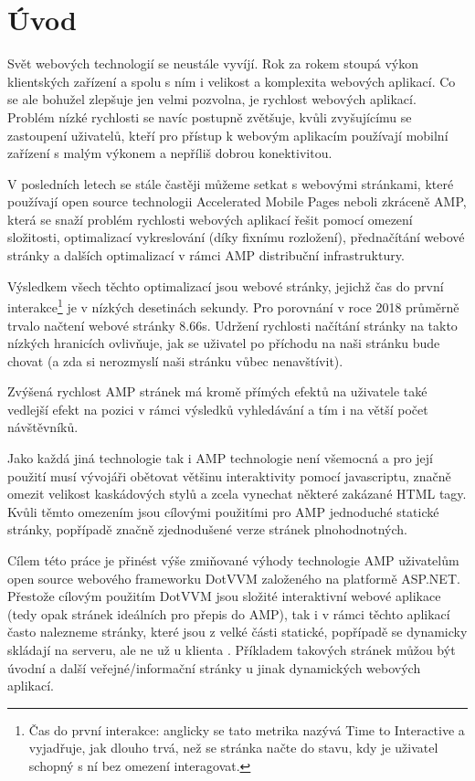 \chapter{Úvod}

Svět webových technologií se neustále vyvíjí. Rok za rokem stoupá výkon klientských zařízení a spolu s
ním i velikost a komplexita webových aplikací. Co se ale bohužel zlepšuje jen velmi pozvolna, je rychlost
webových aplikací. Problém nízké rychlosti se navíc postupně zvětšuje, kvůli zvyšujícímu se zastoupení
uživatelů, kteří pro přístup k webovým aplikacím používají mobilní zařízení s malým výkonem a nepříliš
dobrou konektivitou.

V posledních letech se stále častěji můžeme setkat s webovými stránkami, které používají open source technologii Accelerated Mobile Pages neboli zkráceně AMP, která se snaží problém rychlosti webových aplikací
řešit pomocí omezení složitosti, optimalizací vykreslování (díky fixnímu rozložení), přednačítání webové
stránky a dalších optimalizací v rámci AMP distribuční infrastruktury.

Výsledkem všech těchto optimalizací jsou webové stránky, jejichž čas do první interakce\footnote{Čas do první interakce: anglicky se tato metrika nazývá Time to Interactive a vyjadřuje, jak dlouho trvá, než se stránka načte do stavu, kdy je uživatel schopný s ní bez omezení interagovat.} je v nízkých desetinách sekundy. Pro porovnání v roce 2018 průměrně trvalo načtení webové
stránky 8.66s\cite{TTI}.
Udržení rychlosti načítání stránky na takto nízkých hranicích ovlivňuje, jak se uživatel po příchodu na naši
stránku bude chovat (a zda si nerozmyslí naši stránku vůbec nenavštívit).

Zvýšená rychlost AMP stránek má kromě přímých efektů na uživatele také vedlejší efekt na pozici
v rámci výsledků vyhledávání a tím i na větší počet návštěvníků.

Jako každá jiná technologie tak i AMP technologie není všemocná a pro její použití musí vývojáři
obětovat většinu interaktivity pomocí javascriptu, značně omezit velikost kaskádových stylů a zcela
vynechat některé zakázané HTML tagy. Kvůli těmto omezením jsou cílovými použitími pro AMP jednoduché statické stránky, popřípadě značně
zjednodušené verze stránek plnohodnotných.

Cílem této práce je přinést výše zmiňované výhody technologie AMP uživatelům open source webového
frameworku DotVVM založeného na platformě ASP.NET.
Přestože cílovým použitím DotVVM jsou složité interaktivní webové aplikace (tedy opak stránek ideálních pro přepis do AMP), tak i v rámci těchto aplikací často nalezneme stránky, které jsou z velké části statické, popřípadě se dynamicky skládají na serveru, ale ne už u klienta \cite{DotVVMIntro}. Příkladem takových stránek můžou být úvodní a další veřejné/informační stránky u jinak dynamických webových aplikací. 

